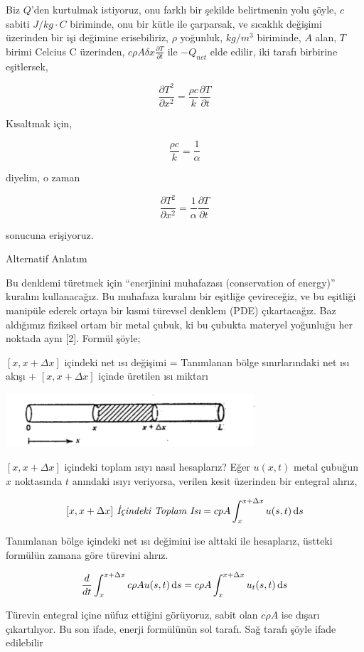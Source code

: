 \documentclass[12pt,fleqn]{article}\usepackage{../../common}
\begin{document}
Biz $Q$'den kurtulmak istiyoruz, onu farklı bir şekilde belirtmenin yolu şöyle,
$c$ sabiti $J / kg \cdot C$ biriminde, onu bir kütle ile çarparsak, ve sıcaklık
değişimi üzerinden bir işi değimine erisebiliriz, $\rho$ yoğunluk, $kg/m^3$
biriminde, $A$ alan, $T$ birimi Celcius C üzerinden,
$c \rho A \delta x \frac{\partial T}{\partial t}$ ile $-Q_{net}$ elde edilir,
iki tarafı birbirine eşitlersek,

$$
\frac{\partial T^2}{\partial x^2} = \frac{\rho c}{k} \frac{\partial T}{\partial t}
$$

Kısaltmak için,

$$
 \frac{\rho c}{k} = \frac{1}{\alpha}
$$

diyelim, o zaman

$$
\frac{\partial T^2}{\partial x^2} = \frac{1}{\alpha} \frac{\partial T}{\partial t}
$$

sonucuna erişiyoruz.

Alternatif Anlatım

Bu denklemi türetmek için ``enerjinini muhafazası (conservation of
energy)'' kuralını kullanacağız. Bu muhafaza kuralını bir eşitliğe
çevireceğiz, ve bu eşitliği manipüle ederek ortaya bir kısmi türevsel
denklem (PDE) çıkartacağız. Baz aldığımız fiziksel ortam bir metal çubuk,
ki bu çubukta materyel yoğunluğu her noktada aynı [2].  Formül şöyle;

$[x,x+\Delta x]$ içindeki net ısı değişimi = Tanımlanan bölge
sınırlarındaki net ısı akışı + $[x,x+\Delta x]$ içinde üretilen ısı miktarı

\includegraphics[height=2cm]{heat_1.png}

$[x,x+\Delta x]$ içindeki toplam ısıyı nasıl hesaplarız? Eğer $u(x,t)$
metal çubuğun $x$ noktasında $t$ anındaki ısıyı veriyorsa, verilen kesit
üzerinden bir entegral alırız,

$$
[x,x+\Delta x] \textit{ İçindeki Toplam Isı} = 
cpA \int _{ x}^{x+\Delta x}u(s,t) \,\mathrm{d} s
$$

Tanımlanan bölge içindeki net ısı değimini ise alttaki ile hesaplarız,
üstteki formülün zamana göre türevini alırız. 

$$
\frac{d}{dt} \int _{ x}^{x+\Delta x} c\rho A u(s,t) \,\mathrm{d} s = 
c\rho A  \int _{ x}^{x+\Delta x} u_t(s,t) \,\mathrm{d} s
$$

Türevin entegral içine nüfuz ettiğini görüyoruz, sabit olan $c\rho A$ ise
dışarı çıkartılıyor. Bu son ifade, enerji formülünün sol tarafı. Sağ tarafı
şöyle ifade edilebilir
\end{document}
